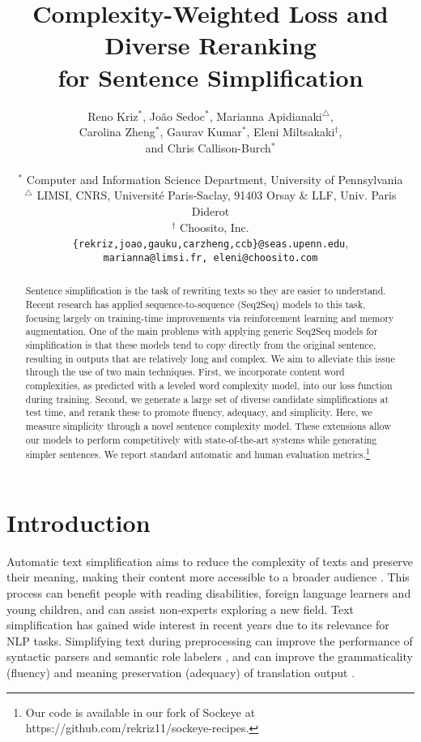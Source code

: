 \documentclass[11pt,a4paper]{article}
\title{Complexity-Weighted Loss and Diverse Reranking \\ for Sentence Simplification}
\author{\parbox{12cm}{\centering Reno Kriz$^{*}$, Jo\~ao Sedoc$^{*}$, Marianna Apidianaki$^{\triangle}$, \\ Carolina Zheng$^{*}$, Gaurav Kumar$^{*}$, Eleni Miltsakaki$^{\dagger}$, \\ and Chris Callison-Burch$^{*}$} \\
$^{*}$ Computer and Information Science Department, University of Pennsylvania \\
$^{\triangle}$ LIMSI, CNRS, Universit\'e Paris-Saclay, 91403 Orsay \& LLF, Univ. Paris Diderot \\
$^{\dagger}$ Choosito, Inc. \\ 
{\tt \{rekriz,joao,gauku,carzheng,ccb\}@seas.upenn.edu}, \\ {\tt marianna@limsi.fr, eleni@choosito.com}
}
\date{}
\begin{document}
\maketitle

\begin{abstract}
    Sentence simplification is the task of rewriting texts so they are easier to understand. Recent research has applied sequence-to-sequence (Seq2Seq) models to this task, focusing largely on training-time improvements via reinforcement learning and memory augmentation. One of the main problems with applying generic Seq2Seq models for simplification is that these models tend to copy directly from the original sentence, resulting in outputs that are relatively long and complex. We aim to alleviate this issue through the use of two main techniques. 
    First, we incorporate content word complexities, as predicted with a leveled word complexity model, into our loss function during training.
    Second, we generate a large set of diverse candidate simplifications at test time, and rerank these to promote fluency, adequacy, and simplicity. Here, we measure simplicity through a novel sentence complexity model. 
    These extensions allow our models to perform competitively with state-of-the-art systems while generating simpler sentences.
    We report standard automatic and human evaluation metrics.\footnote{Our code is available in our fork of Sockeye \cite{hieber2017sockeye} at https://github.com/rekriz11/sockeye-recipes.} 
\end{abstract}

\section{Introduction}

Automatic text simplification aims to reduce the complexity of texts and preserve their meaning, making their content more accessible to a broader audience \cite{saggion2017automatic}.
This process can benefit people with reading disabilities, foreign language learners and young children, and can assist non-experts exploring a new field. Text simplification has gained wide interest in recent years due to its relevance for NLP tasks. Simplifying text during preprocessing can improve the performance of syntactic parsers \cite{chandrasekar1996motivations} and semantic role labelers \cite{vickrey2008sentence,woodsend2014text}, and can improve the grammaticality (fluency) and meaning preservation (adequacy) of  translation output \cite{stajner2016text}.
\end{document}
